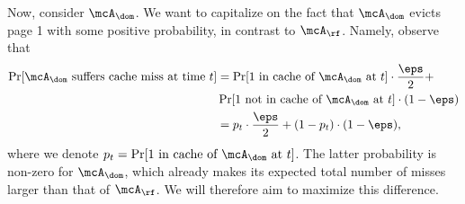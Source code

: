 Now, consider $\mcA_{\dom}$. We want to capitalize on the fact that $\mcA_\dom$ evicts page 1 with some positive probability, in contrast to $\mcA_\rf$. Namely, observe that 
\begin{align}
    \Pr[\text{$\mcA_\dom$ suffers cache miss at time $t$}] &= \Pr[\text{$1$ in cache of $\mcA_\dom$ at $t$}] \cdot \frac{\eps}{2} + \nonumber\\
    & \Pr[\text{$1$ not in cache of $\mcA_\dom$ at $t$}] \cdot (1-\eps) \nonumber \\
    &= p_t \cdot \frac{\eps}{2} + (1-p_t) \cdot (1-\eps), \label{eqn:misses-A-dom}
\end{align}
where we denote $p_t = \Pr[\text{$1$ in cache of $\mcA_\dom$ at $t$}]$. The latter probability is non-zero for $\mcA_\dom$, which already makes its expected total number of misses larger than that of $\mcA_\rf$. We will therefore aim to maximize this difference.

